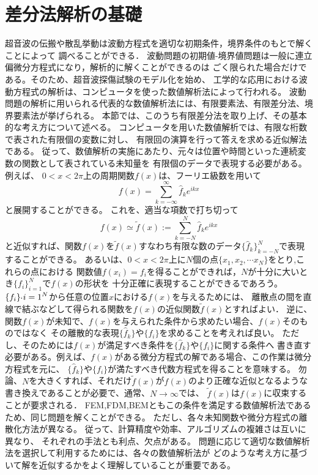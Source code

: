 \documentclass[10pt,a4j,dvipdfmx]{jarticle}
\begin{document}
\section{差分法解析の基礎}
超音波の伝搬や散乱挙動は波動方程式を適切な初期条件，境界条件のもとで解くことによって
調べることができる．
波動問題の初期値-境界値問題は一般に連立偏微分方程式になり，解析的に解くことができるのは
ごく限られた場合だけである。そのため、超音波探傷試験のモデル化を始め、
工学的な応用における波動方程式の解析は、コンピュータを使った数値解析法によって行われる。
波動問題の解析に用いられる代表的な数値解析法には、有限要素法、有限差分法、境界要素法が挙げられる。
本節では、このうち有限差分法を取り上げ、その基本的な考え方について述べる。
コンピュータを用いた数値解析では、有限な桁数で表された有限個の変数に対し、
有限回の演算を行って答えを求める近似解法である。
従って、数値解析の実施にあたり、元々は位置や時間といった連続変数の関数として表されている未知量を
有限個のデータで表現する必要がある。例えば、
$0<x<2\pi$上の周期関数$f(x)$は、フーリエ級数を用いて
\begin{equation}
	f(x)=\sum_{k=-\infty}^{\infty} \hat{f}_ke^{ikx}
	\label{eqn:}
\end{equation}
と展開することができる。
これを、適当な項数で打ち切って
\begin{equation}
	f(x) \simeq \tilde f(x) :=\sum_{k=-N}^{N} \hat{f}_ke^{ikx}
	\label{eqn:}
\end{equation}
と近似すれば、関数$f(x)$を$\tilde f (x)$すなわち有限な数のデータ$\{ \hat{f}_k\}_{k=-N}^{N}$で表現することができる。
あるいは、$0<x<2\pi $上に$N$個の点$\{ x_1,x_2, \cdots x_N \}$をとり,これらの点における
関数値$f(x_i)=f_i$を得ることができれば，$N$が十分に大いとき$\{f_i\}_{i=1}^N$で$f(x)$の形状を
十分正確に表現することができるであろう。$\{ f_i \}_`{i=1}^N$から任意の位置$x$における$f(x)$を与えるためには、
離散点の間を直線で結ぶなどして得られる関数を$f(x)$の近似関数$\tilde f(x)$とすればよい．
逆に、関数$f(x)$が未知で、$f(x)$を与えられた条件から求めたい場合、$f(x)$そのものではなく
その離散的な表現$\{\hat{f}_k\}$や$\{f_i\}$を求めることを考えれば良い。
ただし、そのためには$f(x)$が満足すべき条件を$\{\hat{f}_k\}$や$\{f_i\}$に関する条件へ
書き直す必要がある。例えば、$f(x)$がある微分方程式の解である場合、この作業は微分方程式を元に、
$\{\hat{f}_k\}$や$\{f_i\}$が満たすべき代数方程式を得ることを意味する。
勿論、$N$を大きくすれば、それだけ$\tilde f(x)$が$f(x)$のより正確な近似となるような
書き換えであることが必要で、通常、$N\rightarrow \infty$では、
$\tilde f(x)$は$f(x)$に収束することが要求される．
FEM,FDM,BEMともこの条件を満足する数値解析法であるため、同じ問題を解くことができる。
ただし、各々未知関数や微分方程式の離散化方法が異なる。
従って、計算精度や効率、アルゴリズムの複雑さは互いに異なり、
それぞれの手法とも利点、欠点がある。
問題に応じて適切な数値解析法を選択して利用するためには、各々の数値解析法が
どのような考え方に基づいて解を近似するかをよく理解していることが重要である。
\end{document}
